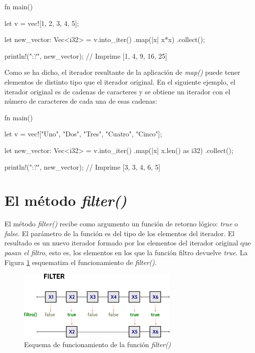 \vspace{0.7em}
\begin{Codigo}
fn main() {
   let v = vec![1, 2, 3, 4, 5];
   
   let new_vector: Vec<i32> = v.into_iter() 
      .map(|x| x*x)
      .collect();
   
   println!("{:?}", new_vector); // Imprime [1, 4, 9, 16, 25]
}
\end{Codigo}

Como se ha dicho, el iterador resultante de la aplicación de \textit{map()} puede tener elementos de distinto tipo que el iterador original. En el siguiente ejemplo, el iterador original es de cadenas de caracteres y se obtiene un iterador con el número de caracteres de cada una de esas cadenas:

\vspace{0.7em}
\begin{Codigo}
fn main() {
   let v = vec!["Uno", "Dos", "Tres", "Cuatro", "Cinco"];
   
   let new_vector: Vec<i32> = v.into_iter()
      .map(|x| x.len() as i32)
      .collect();
   
   println!("{:?}", new_vector); // Imprime [3, 3, 4, 6, 5]
}
\end{Codigo}

\section{El método \textit{filter()}}
El método \textit{filter()} recibe como argumento un función de retorno lógico: \textit{true} o \textit{false}. El parámetro de la función es del tipo de los elementos del iterador. El resultado es un nuevo iterador formado por los elementos del iterador original que \textit{pasan el filtro}, esto es, los elementos en los que la función filtro devuelve \textit{true}. La Figura \ref{fig_filter} esquematiza el funcionamiento de \textit{filter()}.


\begin{figure}[htb]
   \begin{center}
      \includegraphics[width=0.7\textwidth]{img/filter.png}
      \caption{Esquema de funcionamiento de la función \textit{filter()}}
      \label{fig_filter}
   \end{center}
\end{figure}

